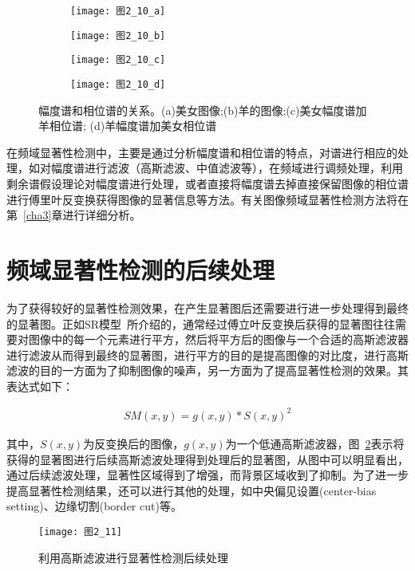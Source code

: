\begin{figure}[b]
  \centering%
  \begin{subfigure}{0.3\textwidth}
    \texttt{[image: 图2\_10\_a]}
    \caption{}
  \end{subfigure}
  \hspace{4em}%
  \begin{subfigure}{0.3\textwidth}
    \texttt{[image: 图2\_10\_b]}
    \caption{}
  \end{subfigure}
  \hspace{4em}%
  \begin{subfigure}{0.3\textwidth}
    \texttt{[image: 图2\_10\_c]}
    \caption{}
  \end{subfigure}
  \hspace{4em}%
  \begin{subfigure}{0.3\textwidth}
    \texttt{[image: 图2\_10\_d]}
    \caption{}
  \end{subfigure}
  \caption{幅度谱和相位谱的关系。(a)美女图像;(b)羊的图像;(c)美女幅度谱加羊相位谱; (d)羊幅度谱加美女相位谱}
  \label{图2_10}
\end{figure}

在频域显著性检测中，主要是通过分析幅度谱和相位谱的特点，对谱进行相应的处理，如对幅度谱进行滤波（高斯滤波、中值滤波等），在频域进行调频处理，利用剩余谱假设理论对幅度谱进行处理，或者直接将幅度谱去掉直接保留图像的相位谱进行傅里叶反变换获得图像的显著信息等方法。有关图像频域显著性检测方法将在第~\ref{cha3}章进行详细分析。

\section{频域显著性检测的后续处理}
\label{2_4}

为了获得较好的显著性检测效果，在产生显著图后还需要进行进一步处理得到最终的显著图\cite{BorjiTIP2013Quantitative}。正如SR模型~\cite{HouXiaodiCVPR2007Residual}所介绍的，通常经过傅立叶反变换后获得的显著图往往需要对图像中的每一个元素进行平方，然后将平方后的图像与一个合适的高斯滤波器进行滤波从而得到最终的显著图，进行平方的目的是提高图像的对比度，进行高斯滤波的目的\cite{ZhangLiming2010Book}一方面为了抑制图像的噪声，另一方面为了提高显著性检测的效果。其表达式如下：
\begin{linenomath}
\begin{align}
SM(x,y)=g(x,y)\ast S(x,y)^{2}
\label{式2_37}
\end{align}
\end{linenomath}
其中，$S(x,y)$为反变换后的图像，$g(x,y)$为一个低通高斯滤波器，图~\ref{图2_11}表示将获得的显著图进行后续高斯滤波处理得到处理后的显著图，从图中可以明显看出，通过后续滤波处理，显著性区域得到了增强，而背景区域收到了抑制。为了进一步提高显著性检测结果，还可以进行其他的处理，如中央偏见设置(center-bias setting)、边缘切割(border cut)等。
\begin{figure}[h] %
  \centering
  \texttt{[image: 图2\_11]}
  \caption{利用高斯滤波进行显著性检测后续处理}
  \label{图2_11}
\end{figure}

